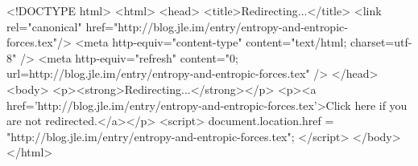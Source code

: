 <!DOCTYPE html>
<html>
<head>
<title>Redirecting...</title>
<link rel="canonical" href="http://blog.jle.im/entry/entropy-and-entropic-forces.tex"/>
<meta http-equiv="content-type" content="text/html; charset=utf-8" />
<meta http-equiv="refresh" content="0; url=http://blog.jle.im/entry/entropy-and-entropic-forces.tex" />
</head>
<body>
  <p><strong>Redirecting...</strong></p>
  <p><a href='http://blog.jle.im/entry/entropy-and-entropic-forces.tex'>Click here if you are not redirected.</a></p>
  <script>
    document.location.href = "http://blog.jle.im/entry/entropy-and-entropic-forces.tex";
  </script>
</body>
</html>
